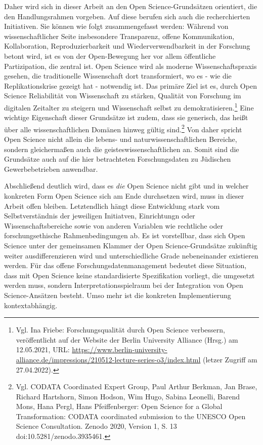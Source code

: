 Daher wird sich in dieser Arbeit an den Open Science-Grundsätzen orientiert, die den Handlungsrahmen vorgeben. Auf diese berufen sich auch die recherchierten Initiativen. Sie können wie folgt zusammengefasst werden: Während von wissenschaftlicher Seite insbesondere Transparenz, offene Kommunikation, Kollaboration, Reproduzierbarkeit und Wiederverwendbarkeit in der Forschung betont wird, ist es von der Open-Bewegung her vor allem öffentliche Partizipation, die zentral ist. Open Science wird als moderne Wissenschaftspraxis gesehen, die traditionelle Wissenschaft dort transformiert, wo es - wie die Replikationskrise gezeigt hat - notwendig ist. Das primäre Ziel ist es, durch Open Science Reliabilität von Wissenschaft zu stärken, Qualität von Forschung im digitalen Zeitalter zu steigern und Wissenschaft selbst zu demokratisieren.\footnote{Vgl. Ina Friebe: Forschungsqualität durch Open Science verbessern, veröffentlicht auf der Website der Berlin University Alliance (Hrsg.) am 12.05.2021, URL: \url{https://www.berlin-university-alliance.de/impressions/210512-lecture-series-o3/index.html} (letzer Zugriff am 27.04.2022).} Eine wichtige Eigenschaft dieser Grundsätze ist zudem, dass sie generisch, das heißt über alle wissenschaftlichen Domänen hinweg gültig sind.\footnote{Vgl. CODATA Coordinated Expert Group, Paul Arthur Berkman, Jan Brase, Richard Hartshorn, Simon Hodson, Wim Hugo, Sabina Leonelli, Barend Mons, Hana Pergl, Hans Pfeiffenberger: Open Science for a Global Transformation: CODATA coordinated submission to the UNESCO Open Science Consultation. Zenodo 2020, Version 1, S. 13 doi:10.5281/zenodo.3935461.} Von daher spricht Open Science nicht allein die lebens- und naturwissenschaftlichen Bereiche, sondern gleichermaßen auch die geisteswissenschaftlichen an. Somit sind die Grundsätze auch auf die hier betrachteten Forschungsdaten zu Jüdischen Gewerbebetrieben anwendbar.

Abschließend deutlich wird, dass es \textit{die} Open Science nicht gibt und in welcher konkreten Form Open Science sich am Ende durchsetzen wird, muss in dieser Arbeit offen bleiben. Letztendlich hängt diese Entwicklung stark vom Selbstverständnis der jeweiligen Initiatven, Einrichtungn oder Wissenschaftsbereiche sowie von anderen Variablen wie rechtliche oder forschungsethische Rahmenbedingungen ab. Es ist vorstellbar, dass sich Open Science unter der gemeinsamen Klammer der Open Science-Grundsätze zukünftig weiter ausdifferenzieren wird und unterschiedliche Grade nebeneinander existieren werden. Für das offene Forschungsdatenmanagement bedeutet diese Situation, dass mit Open Science keine standardisierte Spezifikation vorliegt, die umgesetzt werden muss, sondern Interpretationsspielraum bei der Integration von Open Science-Ansätzen besteht. Umso mehr ist die konkreten Implementierung kontextabhängig.

